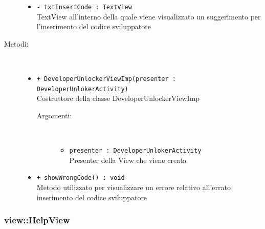 \documentclass[../DefinizioneDiProdotto.tex]{subfiles}
\begin{document}
\begin{description}
\begin{itemize}
\item \texttt{- txtInsertCode : TextView}\\
TextView all'interno della quale viene visualizzato un suggerimento per l'inserimento del codice sviluppatore

\end{itemize}
\item[Metodi:] \
\begin{itemize}
\item \texttt{+ DeveloperUnlockerViewImp(presenter : DeveloperUnlokerActivity)}\\
Costruttore della classe DeveloperUnlockerViewImp
 \begin{description}
\item[Argomenti:] \
\begin{itemize}
\item \texttt{presenter : DeveloperUnlokerActivity}\\
Presenter della View che viene creata\end{itemize}
\end{description}
\item \texttt{+ showWrongCode() : void}\\
Metodo utilizzato per visualizzare un errore relativo all'errato inserimento del codice sviluppatore
 \end{itemize}
\end{description}

\subsubsection{view::HelpView}
\end{document}
